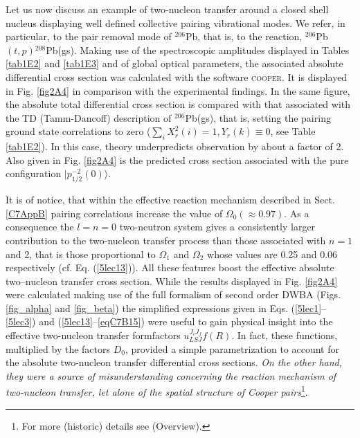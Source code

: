 Let us now discuss an example of two-nucleon transfer around a closed shell nucleus displaying well defined collective pairing vibrational modes. We refer, in particular, to the pair removal mode of $^{206}$Pb, that is, to the reaction, $^{206}$Pb$(t,p)$$^{208}$Pb(gs). Making use of the spectroscopic amplitudes displayed in Tables \ref{tab1E2} and \ref{tab1E3} and of global optical parameters, the associated  absolute differential cross section was calculated  with the software \textsc{cooper}. It is displayed in Fig. \ref{fig2A4} in comparison with the experimental findings. In  the same figure, the absolute total differential cross section is compared with that associated with the TD (Tamm-Dancoff) description of $^{206}$Pb(gs), that is, setting the pairing ground state correlations to zero ($\sum_i X^2_r(i)=1, Y_r(k)\equiv 0$, see Table \ref{tab1E2}). In this case, theory underpredicts observation by about a factor of 2.  Also given in Fig. \ref{fig2A4} is the predicted cross section associated with the pure configuration $|p_{1/2}^{-2}(0)\rangle$. 


It is of notice, that within the effective reaction mechanism described in Sect. \ref{C7AppB} pairing correlations increase the value of $\Omega_0(\approx 0.97)$. As a consequence the   $l=n=0$ two-neutron system gives a consistently larger contribution to the two-nucleon transfer process than those associated with $n=1$ and 2, that is those proportional to $\Omega_1$ and $\Omega_2$ whose values are 0.25 and 0.06 respectively (cf. Eq. (\ref{5lec13})). All these features boost the effective absolute two--nucleon  transfer cross section. While the results displayed in Fig. \ref{fig2A4} were calculated making use of the full formalism of second order DWBA (Figs. \ref{fig_alpha} and \ref{fig_beta}) the simplified expressions given in Eqs. (\ref{5lec1}--\ref{5lec3}) and (\ref{5lec13}--\ref{eqC7B15}) were useful to gain physical insight into the effective  two-nucleon transfer formfactors $u^{J_iJ_f}_{LSJ}f(R)$. In fact, these functions, multiplied by the factors $D_0$, provided a simple parametrization to account for the absolute two-nucleon transfer  differential cross sections. \emph{On the other hand, they were a source of misunderstanding concerning the reaction mechanism of two-nucleon transfer, let alone of the spatial structure of Cooper pairs}\footnote{For more (historic) details see \cite{Bohr:19} (Overview).}.



